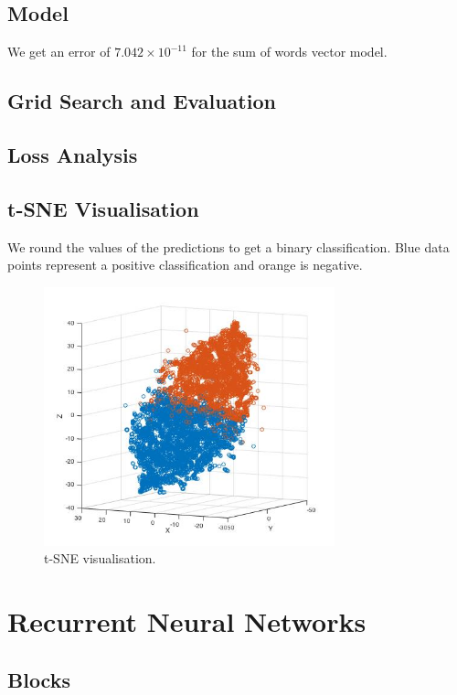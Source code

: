 \documentclass{article} %
\begin{document}
\subsection{Model}

We get an error of $7.042 \times 10^{-11}$ for the sum of words vector model.

\subsection{Grid Search and Evaluation}

\subsection{Loss Analysis}

\subsection{t-SNE Visualisation}

We round the values of the predictions to get a binary classification. Blue data points represent a positive classification and orange is negative.

\begin{figure}[H]
\centering
\includegraphics[width=0.75\textwidth]{graphics/tsneplot.jpg}
\caption{t-SNE visualisation.}
\end{figure}

\section{Recurrent Neural Networks}

\subsection{Blocks}
\end{document}
